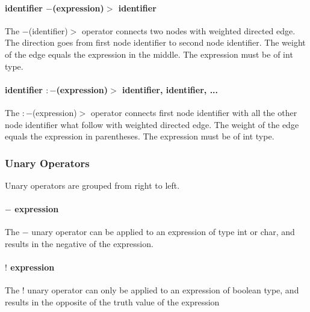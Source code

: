 \documentclass[a4paper,12pt]{article}
\begin{document}

\paragraph{identifier $-$(expression)$>$ identifier}
The $-$(identifier)$>$ operator connects two nodes with weighted directed edge. The direction goes from first node identifier to second node identifier. The weight of the edge equals the expression in the middle. The expression must be of int type.


\paragraph{identifier $:-$(expression)$>$ identifier, identifier, ... }
The $:-$(expression)$>$ operator connects first node identifier with all the other node identifier what follow with weighted directed edge. The weight of the edge equals the expression in parentheses. The expression must be of int type.

\subsubsection{Unary Operators}
Unary operators are grouped from right to left.
\paragraph{$-$ expression}
The $-$ unary operator can be applied to an expression of type int or char, and results in the negative of the expression.

\paragraph{$!$ expression}
The $!$ unary operator can only be applied to an expression of boolean type, and results in the opposite of the truth value of the expression
\end{document}
